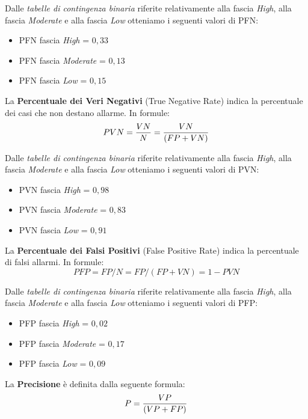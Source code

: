 Dalle \textit{tabelle di contingenza binaria} riferite relativamente alla fascia \textit{High}, alla fascia \textit{Moderate} e alla fascia \textit{Low} otteniamo i seguenti valori di PFN:
\begin{itemize}
\item PFN fascia \textit{High} = $0,33$
\item PFN fascia \textit{Moderate} = $0,13$
\item PFN fascia \textit{Low} = $0,15$
\end{itemize}

La \textbf{Percentuale dei Veri Negativi} (True Negative Rate) indica la percentuale dei casi che non destano allarme. In formule:
\begin{equation}
PVN = {VN \over N} = {VN \over {(FP + VN)}}
\end{equation}

Dalle \textit{tabelle di contingenza binaria} riferite relativamente alla fascia \textit{High}, alla fascia \textit{Moderate} e alla fascia \textit{Low} otteniamo i seguenti valori di PVN:
\begin{itemize}
\item PVN fascia \textit{High} = $0,98$
\item PVN fascia \textit{Moderate} = $0,83$
\item PVN fascia \textit{Low} = $0,91$
\end{itemize}

La \textbf{Percentuale dei Falsi Positivi} (False Positive Rate) indica la percentuale di falsi allarmi. In formule:
\begin{equation}
PFP = FP / N = FP / (FP + VN) = 1 - PVN
\end{equation}

Dalle \textit{tabelle di contingenza binaria} riferite relativamente alla fascia \textit{High}, alla fascia \textit{Moderate} e alla fascia \textit{Low} otteniamo i seguenti valori di PFP:
\begin{itemize}
\item PFP fascia \textit{High} = $0,02$
\item PFP fascia \textit{Moderate} = $0,17$
\item PFP fascia \textit{Low} = $0,09$
\end{itemize}

La \textbf{Precisione} è definita dalla seguente formula:
\begin{equation}
P = {VP \over {(VP + FP)}}
\end{equation}

